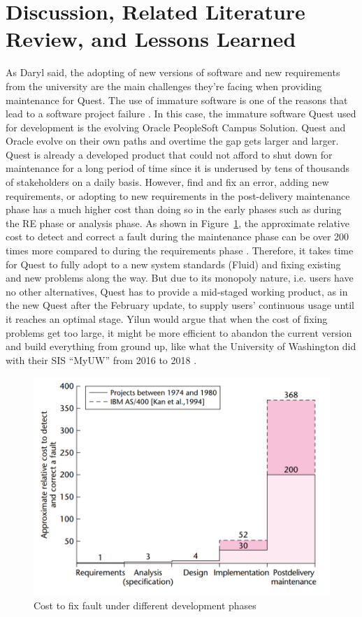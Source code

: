 \documentclass[conference]{IEEEtran}
\begin{document}
\section{Discussion, Related Literature Review, and Lessons Learned}  \label{discussion and reviews}
As Daryl said, the adopting of new versions of software and new requirements from the university are the main challenges they're facing when providing maintenance for Quest. The use of immature software is one of the reasons that lead to a software project failure \cite{b13}. In this case, the immature software Quest used for development is the evolving Oracle PeopleSoft Campus Solution. Quest and Oracle evolve on their own paths and overtime the gap gets larger and larger. Quest is already a developed product that could not afford to shut down for maintenance for a long period of time since it is underused by tens of thousands of stakeholders on a daily basis. However, find and fix an error, adding new requirements, or adopting to new requirements in the post-delivery maintenance phase has a much higher cost than doing so in the early phases such as during the RE phase or analysis phase. As shown in Figure~\ref{fig:figure12}, the approximate relative cost to detect and correct a fault during the maintenance phase can be over 200 times more compared to during the requirements phase \cite{b14}. Therefore, it takes time for Quest to fully adopt to a new system standards (Fluid) and fixing existing and new problems along the way. But due to its monopoly nature, i.e. users have no other alternatives, Quest has to provide a mid-staged working product, as in the new Quest after the February update, to supply users' continuous usage until it reaches an optimal stage. Yilun would argue that when the cost of fixing problems get too large, it might be more efficient to abandon the current version and build everything from ground up, like what the University of Washington did with their SIS ``MyUW'' from 2016 to 2018 \cite{b15}\cite{b16}.

\begin{figure}[htdp]
\centering
  \includegraphics[width=1\columnwidth]{cost.png}
  \caption{Cost to fix fault under different development phases \cite{b14}}
  \label{fig:figure12}
\end{figure}
\end{document}
